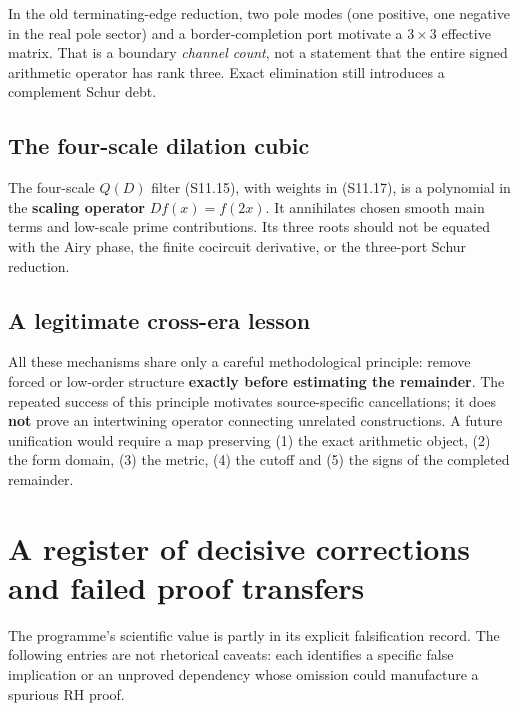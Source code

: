 \documentclass[
  10pt,
  a4paper,
  10pt,
  oneside,
  openany]{book}
\begin{document}
In the old terminating-edge reduction, two pole modes (one positive, one
negative in the real pole sector) and a border-completion port motivate
a \(3\times3\) effective matrix. That is a boundary \emph{channel
count}, not a statement that the entire signed arithmetic operator has
rank three. Exact elimination still introduces a complement Schur debt.

\subsection{The four-scale dilation
cubic}\label{the-four-scale-dilation-cubic}

The four-scale \(Q(D)\) filter (S11.15), with weights in (S11.17), is a
polynomial in the \textbf{scaling operator} \(Df(x)=f(2x)\). It
annihilates chosen smooth main terms and low-scale prime contributions.
Its three roots should not be equated with the Airy phase, the finite
cocircuit derivative, or the three-port Schur reduction.

\subsection{A legitimate cross-era
lesson}\label{a-legitimate-cross-era-lesson}

All these mechanisms share only a careful methodological principle:
remove forced or low-order structure \textbf{exactly before estimating
the remainder}. The repeated success of this principle motivates
source-specific cancellations; it does \textbf{not} prove an
intertwining operator connecting unrelated constructions. A future
unification would require a map preserving (1) the exact arithmetic
object, (2) the form domain, (3) the metric, (4) the cutoff and (5) the
signs of the completed remainder.

\section{A register of decisive corrections and failed proof
transfers}\label{a-register-of-decisive-corrections-and-failed-proof-transfers}

The programme's scientific value is partly in its explicit falsification
record. The following entries are not rhetorical caveats: each
identifies a specific false implication or an unproved dependency whose
omission could manufacture a spurious RH proof.
\end{document}
